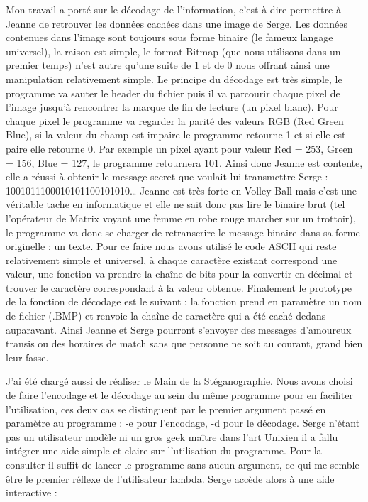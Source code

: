 \documentclass[a4paper,12pt]{article}
\begin{document}
Mon travail a porté sur le décodage de l’information, c'est-à-dire permettre à Jeanne de retrouver les données cachées dans une image de Serge. Les données contenues dans l’image sont toujours sous forme binaire (le fameux langage universel), la raison est simple, le format Bitmap (que nous utilisons dans un premier temps) n’est autre qu’une suite de 1 et de 0 nous offrant ainsi une manipulation relativement simple. Le principe du décodage est très simple, le programme va sauter le header du fichier puis il va parcourir chaque pixel de l’image jusqu’à rencontrer la marque de fin de lecture (un pixel blanc). Pour chaque pixel le programme va regarder la parité des valeurs RGB (Red Green Blue), si la valeur du champ est impaire le programme retourne 1 et si elle est paire elle retourne 0. Par exemple un pixel ayant pour valeur Red = 253, Green = 156, Blue = 127, le programme retournera 101. Ainsi donc Jeanne est contente, elle a réussi à obtenir le message secret que voulait lui transmettre Serge : 1001011100010101100101010… Jeanne est très forte en Volley Ball mais c’est une véritable tache en informatique et elle ne sait donc pas lire le binaire brut (tel l’opérateur de Matrix voyant une femme en robe rouge marcher sur un trottoir), le programme va donc se charger de retranscrire le message binaire dans sa forme originelle : un texte. Pour ce faire nous avons utilisé le code ASCII qui reste relativement simple et universel, à chaque caractère existant correspond une valeur, une fonction va prendre la chaîne de bits pour la convertir en décimal et trouver le caractère correspondant à la valeur obtenue. 
Finalement le prototype de la fonction de décodage est le suivant : la fonction prend en paramètre un nom de fichier (.BMP) et renvoie la chaîne de caractère qui a été caché dedans auparavant. 
Ainsi Jeanne et Serge pourront s’envoyer des messages d’amoureux transis ou des horaires de match sans que personne ne soit au courant, grand bien leur fasse.

J’ai été chargé aussi de réaliser le Main de la Stéganographie.
Nous avons choisi de faire l’encodage et le décodage au sein du même programme pour en faciliter l’utilisation, ces deux cas se distinguent par le premier argument passé en paramètre au programme : 
-e pour l’encodage,
-d pour le décodage. 
Serge n’étant pas un utilisateur modèle ni un gros geek maître dans l’art Unixien il a fallu intégrer une aide simple et claire sur l’utilisation du programme. Pour la consulter il suffit de lancer le programme sans aucun argument, ce qui me semble être le premier réflexe de l’utilisateur lambda. Serge accède alors à une aide interactive :
\end{document}

